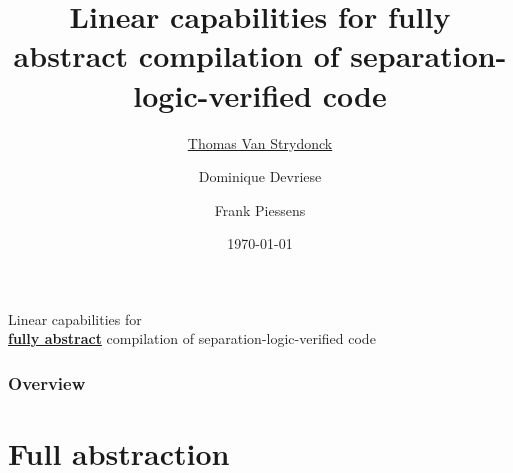 \documentclass{beamer}
\title[Linear Capability Verification]{Linear capabilities for fully abstract
compilation of separation-logic-verified code} %
\author[Thomas Van Strydonck]{\underline{Thomas Van Strydonck} \and Dominique Devriese \and Frank Piessens} %
\institute[KU Leuven] %
{
KU Leuven \\ %
\medskip
\textit{thomas.vanstrydonck@cs.kuleuven.be} %
}
\date{\today} %
\begin{document}


\begin{frame}
\titlepage %
\end{frame}



\begin{frame}[plain,c]
\begin{center}
\Huge Linear capabilities for\\  \textbf{\underline{fully abstract}}
compilation of separation-logic-verified code
\end{center}
\end{frame}


\begin{frame}
\frametitle{Overview} %
\tableofcontents %
\end{frame}


\section{Full abstraction}
\end{document}
